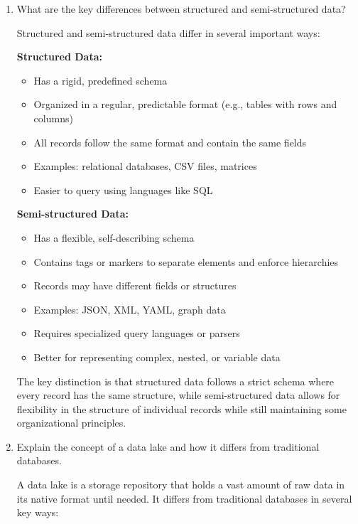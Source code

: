 \documentclass[12pt]{article}
\begin{document}
\begin{enumerate}
    \item What are the key differences between structured and semi-structured data?
    
    \begin{tcolorbox}[colback=blue!5!white,colframe=blue!75!black,title={Solution}]
    Structured and semi-structured data differ in several important ways:
    
    \textbf{Structured Data:}
    \begin{itemize}
        \item Has a rigid, predefined schema
        \item Organized in a regular, predictable format (e.g., tables with rows and columns)
        \item All records follow the same format and contain the same fields
        \item Examples: relational databases, CSV files, matrices
        \item Easier to query using languages like SQL
    \end{itemize}
    
    \textbf{Semi-structured Data:}
    \begin{itemize}
        \item Has a flexible, self-describing schema
        \item Contains tags or markers to separate elements and enforce hierarchies
        \item Records may have different fields or structures
        \item Examples: JSON, XML, YAML, graph data
        \item Requires specialized query languages or parsers
        \item Better for representing complex, nested, or variable data
    \end{itemize}
    
    The key distinction is that structured data follows a strict schema where every record has the same structure, while semi-structured data allows for flexibility in the structure of individual records while still maintaining some organizational principles.
    \end{tcolorbox}
    
    \item Explain the concept of a data lake and how it differs from traditional databases.
    
    \begin{tcolorbox}[colback=blue!5!white,colframe=blue!75!black,title={Solution}]
    A data lake is a storage repository that holds a vast amount of raw data in its native format until needed. It differs from traditional databases in several key ways:
    

\end{tcolorbox}
\end{enumerate}
\end{document}

